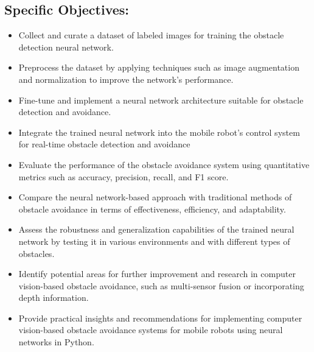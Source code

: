 \subsection{Specific Objectives:}

\begin{itemize}
     \item Collect and curate a dataset of labeled images for training the obstacle detection neural network.
    \item Preprocess the dataset by applying techniques such as image augmentation and normalization to improve the network's performance.
    \item Fine-tune and implement a neural network architecture suitable for obstacle detection and avoidance.
    \item 	Integrate the trained neural network into the mobile robot's control system for real-time obstacle detection and avoidance
    \item Evaluate the performance of the obstacle avoidance system using quantitative metrics such as accuracy, precision, recall, and F1 score.
    \item Compare the neural network-based approach with traditional methods of obstacle avoidance in terms of effectiveness, efficiency, and adaptability.
    \item Assess the robustness and generalization capabilities of the trained neural network by testing it in various environments and with different types of obstacles.
    \item Identify potential areas for further improvement and research in computer vision-based obstacle avoidance, such as multi-sensor fusion or incorporating depth information.
    \item Provide practical insights and recommendations for implementing computer vision-based obstacle avoidance systems for mobile robots using neural networks in Python.
\end{itemize}
